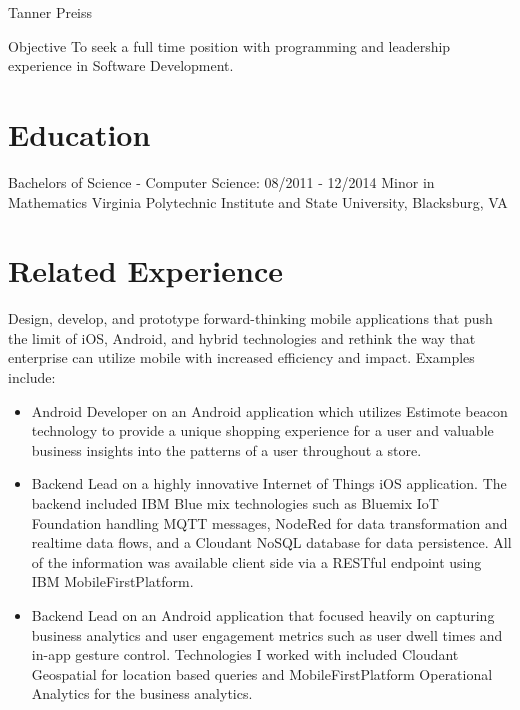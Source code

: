 \documentclass{tpreiss_cv}
\begin{document}
Tanner Preiss



Objective   To seek a full time position with programming and leadership experience in Software Development.

\section{Education}
Bachelors of Science - Computer Science:                                 08/2011 - 12/2014
Minor in Mathematics
Virginia Polytechnic Institute and State University, Blacksburg, VA


\section{Related Experience}


Design, develop, and prototype forward-thinking mobile applications that push the limit of iOS, Android, and hybrid technologies and rethink the way that enterprise can utilize mobile with increased efficiency and impact.
Examples include:
\begin{itemize}
\item Android Developer on an Android application which utilizes Estimote beacon technology to provide a unique shopping experience for a user and valuable business insights into the patterns of a user throughout a store.
\item Backend Lead on a highly innovative Internet of Things iOS application. The backend included IBM Blue
mix technologies such as Bluemix IoT Foundation handling MQTT messages, NodeRed for data transformation and realtime data flows, and a Cloudant NoSQL database for data persistence. All of the information was available client side via a RESTful endpoint using IBM MobileFirstPlatform.  
\item Backend Lead on an Android application that focused heavily on capturing business analytics and user engagement metrics such as user dwell times and in-app gesture control. Technologies I worked with included Cloudant Geospatial for location based queries and MobileFirstPlatform Operational Analytics for the business analytics.
\end{itemize}
\end{document}
